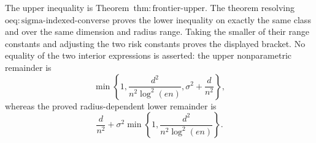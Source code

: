 The upper inequality is Theorem~\(\mathrm{thm:frontier\text{-}upper}\).  The theorem resolving \(\mathrm{oeq:sigma\text{-}indexed\text{-}converse}\) proves the lower inequality on exactly the same class and over the same dimension and radius range.  Taking the smaller of their range constants and adjusting the two risk constants proves the displayed bracket.  No equality of the two interior expressions is asserted: the upper nonparametric remainder is
\[
 \min\left\{1,\frac{d^2}{n^2\log^2(en)},\sigma^2+\frac d{n^2}\right\},
\]
whereas the proved radius-dependent lower remainder is
\[
 \frac d{n^2}+\sigma^2\min\left\{1,\frac{d^2}{n^2\log^2(en)}\right\}.
\]